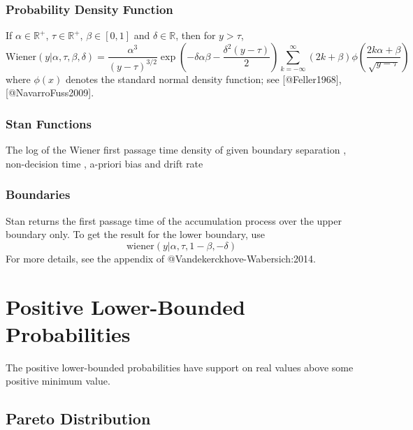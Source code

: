 \begin{description}
{\begin{description}
\subsection{Probability Density Function}


If $\alpha \in \mathbb{R}^+$, $\tau \in \mathbb{R}^+$, $\beta \in [0, 1]$ and $\delta \in \mathbb{R}$, then for $y > \tau$, \[ \text{Wiener}(y|\alpha, \tau, \beta, \delta) = \frac{\alpha^3}{(y-\tau)^{3/2}} \exp \! \left(- \delta \alpha \beta - \frac{\delta^2(y-\tau)}{2}\right) \sum_{k = - \infty}^{\infty} (2k + \beta) \phi \! \left(\frac{2k \alpha + \beta}{\sqrt{y - \tau}}\right) \] where $\phi(x)$ denotes the standard normal density function;  see [@Feller1968], [@NavarroFuss2009].




\subsection{Stan Functions}

\begin{description}   {The log of the Wiener first passage time  density of  given boundary separation ,  non-decision time , a-priori bias  and  drift rate } \end{description}


\subsection{Boundaries}


Stan returns the first passage time of the accumulation process over the upper boundary only. To get the result for the lower boundary, use \[ \text{wiener}(y | \alpha, \tau, 1 - \beta, - \delta) \] For more details, see the appendix of @Vandekerckhove-Wabersich:2014.


\chapter{Positive Lower-Bounded Probabilities}


The positive lower-bounded probabilities have support on real values above some positive minimum value.


\section{Pareto Distribution}



\end{description}}
\end{description}
